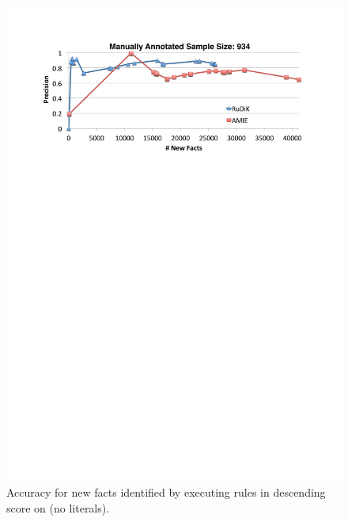 



\begin{figure}[t]
	\centering
	\includegraphics[width=.9\columnwidth]{include/figure/vsAmieDBPedia.pdf}
	\vspace{-2ex}
	\caption{Accuracy for new facts identified by executing rules in descending score on \dbpedia (no literals).}
	\label{fig:vs_amie_dbpedia}
\end{figure}


